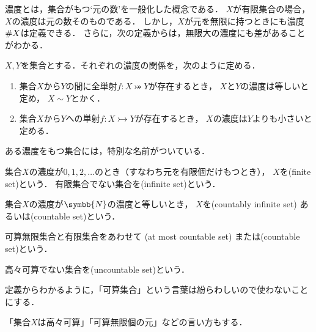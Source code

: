 \documentclass[../sotsu.tex]{subfiles}
\begin{document}
濃度とは，集合がもつ`元の数'を一般化した概念である．
$X$が有限集合の場合，$X$の濃度は元の数そのものである．
しかし，$X$が元を無限に持つときにも濃度$\# X$は定義できる．
さらに，次の定義からは，無限大の濃度にも差があることがわかる．

\begin{definition}[濃度の大小]
    $X, Y$を集合とする．それぞれの濃度の関係を，次のように定める．
    \begin{enumerate}
        \item 集合$X$から$Y$の間に全単射$f \colon X \twoheadrightarrowtail Y$が存在するとき，
            $X$と$Y$の濃度は等しいと定め，
            $X \sim Y$とかく．
        \item 集合$X$から$Y$への単射$f \colon X \rightarrowtail Y$が存在するとき，
            $X$の濃度は$Y$よりも小さいと定める．
    \end{enumerate}
\end{definition}

ある濃度をもつ集合には，特別な名前がついている．

\begin{definition}[有限集合]
    集合$X$の濃度が$0, 1, 2, \dotsc$のとき（すなわち元を有限個だけもつとき），
    $X$を(finite set)という．
    有限集合でない集合を(infinite set)という．
\end{definition}

\begin{definition}[\ruby{可算}{か|さん}集合]
    \label{dfn:countably-infinite}
    集合$X$の濃度が$\symbb{N}$の濃度と等しいとき，
    $X$を(countably infinite set)%
    あるいは(countable set)という．
\end{definition}

\begin{definition}
    \label{dfn:at-most-countable}
    可算無限集合と有限集合をあわせて%
    (at most countable set)%
    または(countable set)という．

    高々可算でない集合を(uncountable set)という．
\end{definition}

定義からわかるように，「可算集合」という言葉は紛らわしいので使わないことにする．

「集合$X$は高々可算」「可算無限個の元」などの言い方もする．
\end{document}
